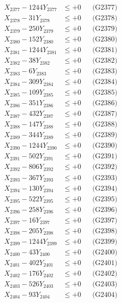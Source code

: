 \documentclass[a4paper,10pt]{article}
\begin{document}
{\begin{align}
X_{2377} - 1244Y_{2377} &\leq +0 && \text{(G2377)} \\
X_{2378} - 31Y_{2378} &\leq +0 && \text{(G2378)} \\
X_{2379} - 250Y_{2379} &\leq +0 && \text{(G2379)} \\
X_{2380} - 152Y_{2380} &\leq +0 && \text{(G2380)} \\
\allowbreak
X_{2381} - 1244Y_{2381} &\leq +0 && \text{(G2381)} \\
X_{2382} - 38Y_{2382} &\leq +0 && \text{(G2382)} \\
X_{2383} - 6Y_{2383} &\leq +0 && \text{(G2383)} \\
X_{2384} - 309Y_{2384} &\leq +0 && \text{(G2384)} \\
X_{2385} - 109Y_{2385} &\leq +0 && \text{(G2385)} \\
X_{2386} - 351Y_{2386} &\leq +0 && \text{(G2386)} \\
X_{2387} - 432Y_{2387} &\leq +0 && \text{(G2387)} \\
X_{2388} - 147Y_{2388} &\leq +0 && \text{(G2388)} \\
X_{2389} - 344Y_{2389} &\leq +0 && \text{(G2389)} \\
X_{2390} - 1244Y_{2390} &\leq +0 && \text{(G2390)} \\
\allowbreak
X_{2391} - 502Y_{2391} &\leq +0 && \text{(G2391)} \\
X_{2392} - 806Y_{2392} &\leq +0 && \text{(G2392)} \\
X_{2393} - 367Y_{2393} &\leq +0 && \text{(G2393)} \\
X_{2394} - 130Y_{2394} &\leq +0 && \text{(G2394)} \\
X_{2395} - 522Y_{2395} &\leq +0 && \text{(G2395)} \\
X_{2396} - 258Y_{2396} &\leq +0 && \text{(G2396)} \\
X_{2397} - 16Y_{2397} &\leq +0 && \text{(G2397)} \\
X_{2398} - 205Y_{2398} &\leq +0 && \text{(G2398)} \\
X_{2399} - 1244Y_{2399} &\leq +0 && \text{(G2399)} \\
X_{2400} - 43Y_{2400} &\leq +0 && \text{(G2400)} \\
\allowbreak
X_{2401} - 402Y_{2401} &\leq +0 && \text{(G2401)} \\
X_{2402} - 176Y_{2402} &\leq +0 && \text{(G2402)} \\
X_{2403} - 526Y_{2403} &\leq +0 && \text{(G2403)} \\
X_{2404} - 93Y_{2404} &\leq +0 && \text{(G2404)} \\

\end{align}}
\end{document}
